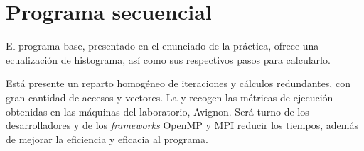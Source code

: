 \part{Programa secuencial}
El programa base, presentado en el enunciado de la práctica, ofrece una ecualización de histograma, así como sus respectivos pasos para calcularlo.

Está presente un reparto homogéneo de iteraciones y cálculos redundantes, con gran cantidad de accesos y vectores. La  y  recogen las métricas de ejecución obtenidas en las máquinas del laboratorio, Avignon.
Será turno de los desarrolladores y de los \textit{frameworks} OpenMP y MPI reducir los tiempos, además de mejorar la eficiencia y eficacia al programa.

